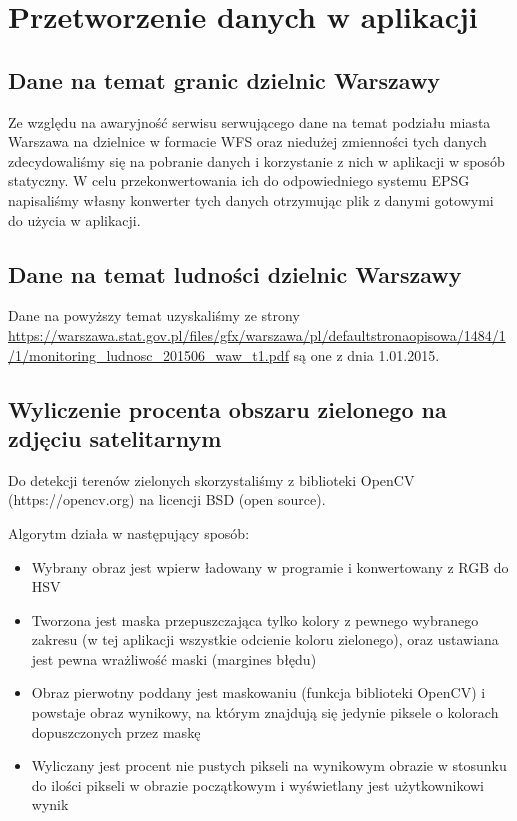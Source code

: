 \documentclass[11pt]{article}
\begin{document}
	\section{Przetworzenie danych w aplikacji}

	\subsection{Dane na temat granic dzielnic Warszawy}
	Ze względu na awaryjność serwisu serwującego dane na temat podziału miasta Warszawa na dzielnice w formacie WFS oraz niedużej zmienności tych danych zdecydowaliśmy się na pobranie danych i korzystanie z nich w aplikacji w sposób statyczny. W celu przekonwertowania ich do odpowiedniego systemu EPSG napisaliśmy własny konwerter tych danych otrzymując plik z danymi gotowymi do użycia w aplikacji.

	\subsection{Dane na temat ludności dzielnic Warszawy}
	Dane na powyższy temat uzyskaliśmy ze strony \url{https://warszawa.stat.gov.pl/files/gfx/warszawa/pl/defaultstronaopisowa/1484/1/1/monitoring_ludnosc_201506_waw_t1.pdf} są one z dnia 1.01.2015.

	\subsection{Wyliczenie procenta obszaru zielonego na zdjęciu satelitarnym}
	Do detekcji terenów zielonych skorzystaliśmy z biblioteki OpenCV (https://opencv.org) na licencji BSD (open source). 

	Algorytm działa w następujący sposób:
	\begin{itemize}
	\item Wybrany obraz jest wpierw ładowany w programie i konwertowany z RGB do HSV
	\item Tworzona jest maska przepuszczająca tylko kolory z pewnego wybranego zakresu (w tej aplikacji wszystkie odcienie koloru zielonego), oraz ustawiana jest pewna wrażliwość maski (margines błędu)
	\item Obraz pierwotny poddany jest maskowaniu (funkcja biblioteki OpenCV) i powstaje obraz wynikowy, na którym znajdują się jedynie piksele o kolorach dopuszczonych przez maskę
	\item Wyliczany jest procent nie pustych pikseli na wynikowym obrazie w stosunku do ilości pikseli w obrazie początkowym i wyświetlany jest użytkownikowi wynik
	\end{itemize}
\end{document}
